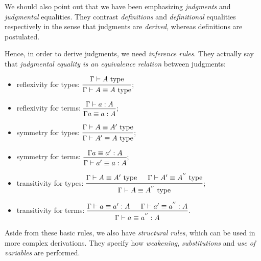 We should also point out that we have been emphasizing \emph{judgments}
and \emph{judgmental} equalities. They contrast \emph{definitions}
and \emph{definitional} equalities respectively in the sense that
judgments are \emph{derived}, whereas definitions are postulated.

Hence, in order to derive judgments, we need \emph{inference rules}.
They actually say that  \emph{judgmental equality is %
  an equivalence relation} between judgments:
\begin{itemize}
\item reflexivity for types:
  $ \begin{prooftree}
    \hypo{\Gamma \vdash A \text{ type}}
    \infer1{\Gamma \vdash A \equiv A \text{ type}}
  \end{prooftree}
  $;
\item reflexivity for terms:
  $ \begin{prooftree}
    \hypo{\Gamma \vdash a : A}
    \infer1{\Gamma a \equiv a : A}
  \end{prooftree}
  $;
\item symmetry for types:
  $ \begin{prooftree}
    \hypo{\Gamma \vdash A \equiv A' \text{ type}}
    \infer1{\Gamma \vdash A' \equiv A \text{ type}}
  \end{prooftree}
  $;
\item symmetry for terms:
  $ \begin{prooftree}
    \hypo{\Gamma a \equiv a' : A}
    \infer1{\Gamma \vdash a' \equiv a : A}
  \end{prooftree}
  $;
\item transitivity for types:
  $ \begin{prooftree}
    \hypo{\Gamma \vdash A \equiv A' \text{ type}}
    \hypo{\Gamma \vdash A' \equiv A^{''} \text{ type}}
    \infer2{\Gamma \vdash A \equiv A^{''} \text{ type}}
  \end{prooftree}
  $;
\item transitivity for terms:
  $ \begin{prooftree}
    \hypo{\Gamma \vdash a \equiv a' : A}
    \hypo{\Gamma \vdash a' \equiv a^{''} : A}
    \infer2{\Gamma \vdash a \equiv a^{''} : A}
  \end{prooftree}
  $.
\end{itemize}

Aside from these basic rules, we also have \emph{structural rules}, which
can be used in more complex derivations. They specify how \emph{weakening},
\emph{substitutions} and \emph{use of variables} are performed.

